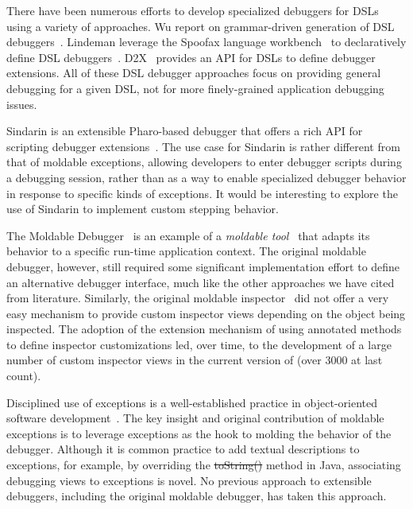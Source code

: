 \documentclass[sigplan,anonymous,review,10pt]{acmart}
\newcommand{\GT}{\lst{GT}\xspace} %
\begin{document}
There have been numerous efforts to develop specialized debuggers for DSLs using a variety of approaches.
Wu \etal report on grammar-driven generation of DSL debuggers~\cite{HuiW08a}.
Lindeman \etal leverage the Spoofax language workbench~\cite{Kats10a} to declaratively define DSL debuggers~\cite{Lind11a}.
D2X~\cite{Brah23a} provides an API for DSLs to define debugger extensions.
All of these DSL debugger approaches focus on providing general debugging for a given DSL, not for more finely-grained application debugging issues.

Sindarin is an extensible Pharo-based debugger that offers a rich API for scripting debugger extensions~\cite{Dupr19a}.
The use case for Sindarin is rather different from that of moldable exceptions, allowing developers to enter debugger scripts during a debugging session, rather than as a way to enable specialized debugger behavior in response to specific kinds of exceptions.
It would be interesting to explore the use of Sindarin to implement custom stepping behavior.

The Moldable Debugger~\cite{Chis15c} is an example of a \emph{moldable tool}~\cite{Chis17a} that adapts its behavior to a specific run-time application context.
The original moldable debugger, however, still required some significant implementation effort to define an alternative debugger interface, much like the other approaches we have cited from literature.
Similarly, the original moldable inspector~\cite{Chis15a} did not offer a very easy mechanism to provide custom inspector views depending on the object being inspected.
The adoption of the extension mechanism of using annotated methods to define inspector customizations led, over time, to the development of a large number of custom inspector views in the current version of \GT (over 3000 at last count).

Disciplined use of exceptions is a well-established practice in object-oriented software development~\cite{Meye88a}.
The key insight and original contribution of moldable exceptions is to leverage exceptions as the hook to molding the behavior of the debugger.
Although it is common practice to add textual descriptions to exceptions, for example, by overriding the \st{toString()} method in Java, associating debugging views to exceptions is novel.
No previous approach to extensible debuggers, including the original moldable debugger, has taken this approach.
\end{document}
